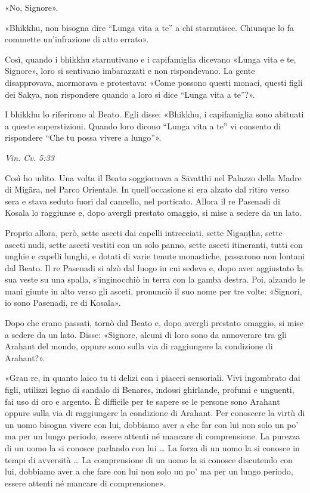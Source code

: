 «No, Signore».


«Bhikkhu, non bisogna dire “Lunga vita a te” a chi starnutisce. Chiunque
lo fa commette un’infrazione di atto errato».


Così, quando i bhikkhu starnutivano e i capifamiglia dicevano «Lunga
vita e te, Signore», loro si sentivano imbarazzati e non rispondevano.
La gente disapprovava, mormorava e protestava: «Come possono questi
monaci, questi figli dei Sakya, non rispondere quando a loro si dice
“Lunga vita a te”?».


I bhikkhu lo riferirono al Beato. Egli disse: «Bhikkhu, i capifamiglia
sono abituati a queste superstizioni. Quando loro dicono “Lunga vita a
te” vi consento di rispondere “Che tu possa vivere a lungo”».


\emph{Vin. Cv. 5:33}


 Così ho udito. Una volta il Beato soggiornava a Sāvatthī nel
Palazzo della Madre di Migāra, nel Parco Orientale. In quell’occasione
si era alzato dal ritiro verso sera e stava seduto fuori dal cancello,
nel porticato. Allora il re Pasenadi di Kosala lo raggiunse e, dopo
avergli prestato omaggio, si mise a sedere da un lato.


Proprio allora, però, sette asceti dai capelli intrecciati, sette
Nigaṇṭha, sette asceti nudi, sette asceti vestiti con un solo panno,
sette asceti itineranti, tutti con unghie e capelli lunghi, e dotati di
varie tenute monastiche, passarono non lontani dal Beato. Il re Pasenadi
si alzò dal luogo in cui sedeva e, dopo aver aggiustato la sua veste su
una spalla, s’inginocchiò in terra con la gamba destra. Poi, alzando le
mani giunte in alto verso gli asceti, pronunciò il suo nome per tre
volte: «Signori, io sono Pasenadi, re di Kosala».


Dopo che erano passati, tornò dal Beato e, dopo avergli prestato
omaggio, si mise a sedere da un lato. Disse: «Signore, alcuni di loro
sono da annoverare tra gli Arahant del mondo, oppure sono sulla via di
raggiungere la condizione di Arahant?».


«Gran re, in quanto laico tu ti delizi con i piaceri sensoriali. Vivi
ingombrato dai figli, utilizzi legno di sandalo di Benares, indossi
ghirlande, profumi e unguenti, fai uso di oro e argento. È difficile per
te sapere se le persone sono Arahant oppure sulla via di raggiungere la
condizione di Arahant. Per conoscere la virtù di un uomo bisogna vivere
con lui, dobbiamo aver a che far con lui non solo un po’ ma per un lungo
periodo, essere attenti né mancare di comprensione. La purezza di un
uomo la si conosce parlando con lui … La forza di un uomo la si conosce
in tempi di avversità … La comprensione di un uomo la si conosce
discutendo con lui, dobbiamo aver a che fare con lui non solo un po’ ma
per un lungo periodo, essere attenti né mancare di comprensione».


